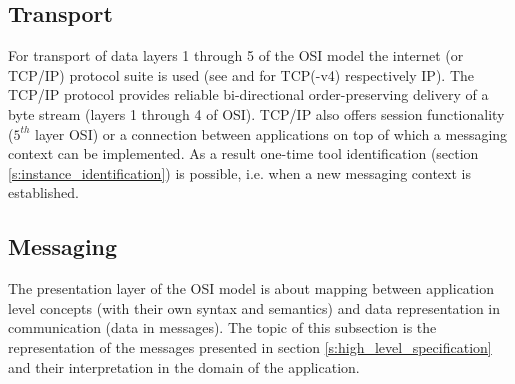 \documentclass{article}
\begin{document}
  \subsection{Transport} \label{ss:transport}

   For transport of data layers 1 through 5 of the OSI model the internet (or
   TCP/IP) protocol suite is used (see \cite{rfc793} and \cite{rfc791} for
   TCP(-v4) respectively IP). The TCP/IP protocol provides reliable
   bi-directional order-preserving delivery of a byte stream (layers 1 through
   4 of OSI). TCP/IP also offers session functionality ($5^{th}$ layer OSI) or a
   connection between applications on top of which a messaging context can be
   implemented. As a result one-time tool identification (section
   \ref{s:instance_identification}) is possible, i.e. when a new messaging
   context is established. %



  \subsection{Messaging}

   The presentation layer of the OSI model is about mapping between application
   level concepts (with their own syntax and semantics) and data representation
   in communication (data in messages). The topic of this subsection is the
   representation of the messages presented in section
   \ref{s:high_level_specification} and their interpretation in the domain of the
   application.
   
\end{document}
